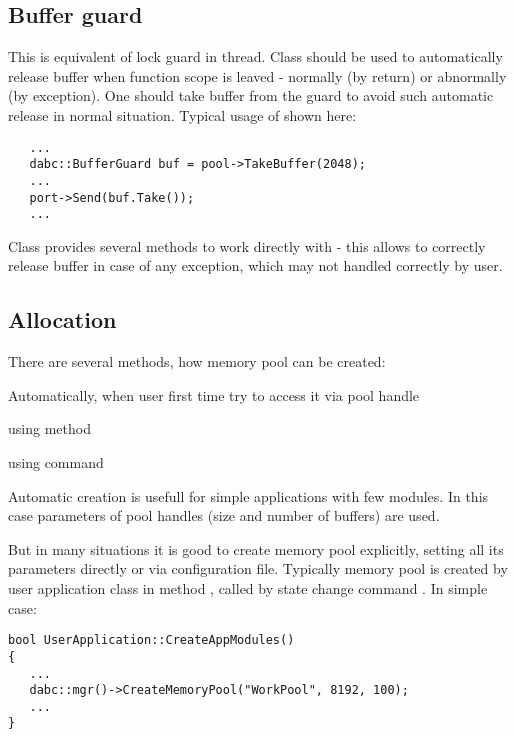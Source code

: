 \subsection{Buffer guard}

This is equivalent of lock guard in thread.
Class  should be used to automatically release 
buffer when function scope is leaved - normally (by return) or abnormally 
(by exception). One should  take buffer from the guard
to avoid such automatic release in normal situation. Typical usage 
of  shown here:

\begin{small}
\begin{verbatim}     
   ...
   dabc::BufferGuard buf = pool->TakeBuffer(2048);
   ...
   port->Send(buf.Take());
   ...
\end{verbatim}     
\end{small}

Class  provides several methods to work directly 
with  - this allows to correctly release buffer
in case of any exception, which may not handled correctly by user.  


\subsection{Allocation}

There are several methods, how memory pool can be created:
\bbul
\item Automatically, when user first time try to access it via pool handle 
\item using  method
\item using  command
\ebul

Automatic creation is usefull for simple applications with few modules.
In this case parameters of pool handles (size and number of buffers) are used. 

But in many situations it is good to create memory pool explicitly,
setting all its parameters directly or via configuration file.
Typically memory pool is created by user application class in 
method , called by state change command .
In simple case:

\begin{small}
\begin{verbatim}     
bool UserApplication::CreateAppModules()
{
   ...
   dabc::mgr()->CreateMemoryPool("WorkPool", 8192, 100);
   ...
}
\end{verbatim}     
\end{small}

